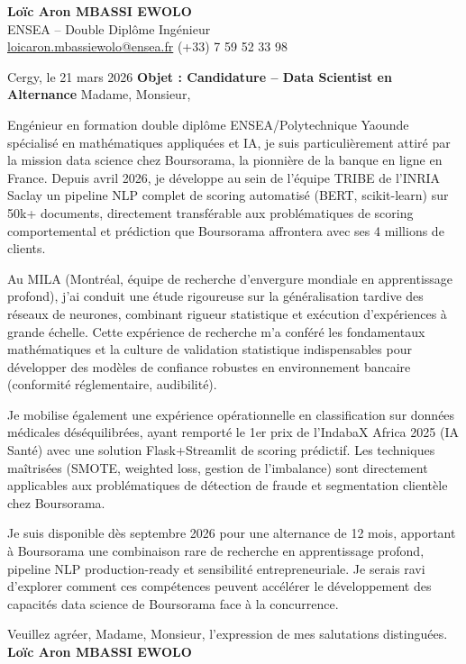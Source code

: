 \documentclass[a4paper,11pt]{article}
\begin{document}
\noindent \textbf{Lo\"ic Aron MBASSI EWOLO} \\
ENSEA -- Double Dipl\^ome Ing\'enieur \\
\href{mailto:loicaron.mbassiewolo@ensea.fr}{loicaron.mbassiewolo@ensea.fr} \quad (+33) 7 59 52 33 98

\vspace{1em}\noindent Cergy, le 21 mars 2026
\vspace{1em}\noindent \textbf{Objet : Candidature -- Data Scientist en Alternance}
\vspace{1.5em}\noindent Madame, Monsieur,

\vspace{0.8em}\noindent Eng\'enieur en formation double dipl\^ome ENSEA/Polytechnique Yaounde sp\'ecialis\'e en math\'ematiques appliqu\'ees et IA, je suis particuli\`erement attir\'e par la mission data science chez Boursorama, la pionnière de la banque en ligne en France. Depuis avril 2026, je d\'eveloppe au sein de l'\'equipe TRIBE de l'INRIA Saclay un pipeline NLP complet de scoring automatisé (BERT, scikit-learn) sur 50k+ documents, directement transférable aux probl\'ematiques de scoring comportemental et prédiction que Boursorama affrontera avec ses 4 millions de clients.

\vspace{0.8em}\noindent Au MILA (Montréal, équipe de recherche d'envergure mondiale en apprentissage profond), j'ai conduit une étude rigoureuse sur la généralisation tardive des réseaux de neurones, combinant rigueur statistique et exécution d'expériences à grande échelle. Cette expérience de recherche m'a conféré les fondamentaux mathématiques et la culture de validation statistique indispensables pour développer des modèles de confiance robustes en environnement bancaire (conformité réglementaire, audibilité).

\vspace{0.8em}\noindent Je mobilise également une expérience opérationnelle en classification sur données médicales déséquilibrées, ayant remporté le 1er prix de l'IndabaX Africa 2025 (IA Santé) avec une solution Flask+Streamlit de scoring prédictif. Les techniques maîtrisées (SMOTE, weighted loss, gestion de l'imbalance) sont directement applicables aux problématiques de détection de fraude et segmentation clientèle chez Boursorama.

\vspace{0.8em}\noindent Je suis disponible dès septembre 2026 pour une alternance de 12 mois, apportant à Boursorama une combinaison rare de recherche en apprentissage profond, pipeline NLP production-ready et sensibilité entrepreneuriale. Je serais ravi d'explorer comment ces compétences peuvent accélérer le développement des capacités data science de Boursorama face à la concurrence.

\vspace{1.5em}\noindent Veuillez agr\'eer, Madame, Monsieur, l'expression de mes salutations distingu\'ees.
\vspace{2em}\noindent \textbf{Lo\"ic Aron MBASSI EWOLO}
\end{document}
